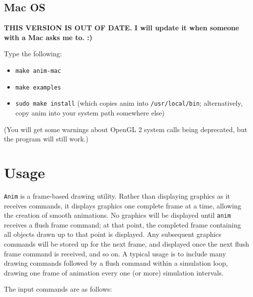 \documentclass[12pt]{article}
\begin{document}
\subsection{Mac OS}

{\bf THIS VERSION IS OUT OF DATE. I will update it when someone with a Mac asks me to. :)}

Type the following:

\begin{itemize}
  \item {\tt make anim-mac}
  \item {\tt make examples}
  \item {\tt sudo make install} (which copies anim into {\tt /usr/local/bin}; alternatively, copy anim into your system path somewhere else)
\end{itemize}

(You will get some warnings about OpenGL 2 system calls being deprecated, but the program will still work.)

\section{Usage}

{\tt Anim} is a frame-based drawing utility. Rather than displaying graphics as it receives commands,
it displays graphics one complete frame at a time, allowing the creation of smooth animations. No graphics
will be displayed until {\tt anim} receives a flush frame command; at that point, the completed frame containing
all objects drawn up to that point is 
displayed. Any subsequent graphics commands will be stored up for the next frame, and displayed once
the next flush frame command is received, and so on. A typical usage is to include many drawing commands
followed by a flush command within a simulation loop, drawing one frame of animation every one (or more) 
simulation intervals.

The input commands are as follows:
\end{document}
